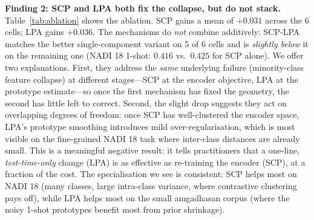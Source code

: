 \documentclass[11pt,a4paper,twocolumn]{article}
\begin{document}
\textbf{Finding 2: SCP and LPA both fix the collapse, but do
not stack.} Table~\ref{tab:ablation} shows the ablation. SCP
gains a mean of $+0.031$ across the 6 cells; LPA gains $+0.036$.
The mechanisms do \emph{not} combine additively: SCP-LPA matches
the better single-component variant on 5 of 6 cells and is
\emph{slightly below} it on the remaining one (NADI 18 1-shot:
$0.416$ vs.\ $0.425$ for SCP alone). We offer two explanations.
First, they address the \emph{same} underlying failure
(minority-class feature collapse) at different stages---SCP at
the encoder objective, LPA at the prototype estimate---so once
the first mechanism has fixed the geometry, the second has
little left to correct. Second, the slight drop suggests they
act on overlapping degrees of freedom: once SCP has
well-clustered the encoder space, LPA's prototype smoothing
introduces mild over-regularisation, which is most visible on
the fine-grained NADI 18 task where inter-class distances are
already small. This is a meaningful negative result: it tells
practitioners that a one-line, \emph{test-time-only} change
(LPA) is as effective as re-training the encoder (SCP), at a
fraction of the cost. The specialisation we see is
consistent: SCP helps most on NADI 18 (many classes, large
intra-class variance, where contrastive clustering pays off),
while LPA helps most on the small amgadhasan corpus (where the
noisy 1-shot prototypes benefit most from prior shrinkage).
\end{document}
